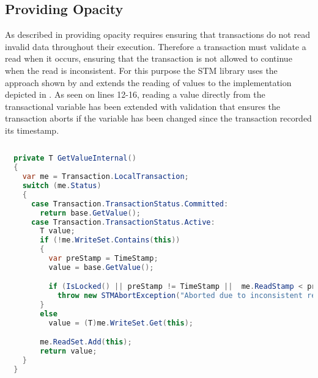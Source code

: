 \subsection{Providing Opacity}
As described in  providing opacity requires ensuring that transactions do not read invalid data throughout their execution. Therefore a transaction must validate a read when it occurs, ensuring that the transaction is not allowed to continue when the read is inconsistent. For this purpose the \ac{STM} library uses the approach shown by \cite[p. 117]{harris2010transactional} and extends the reading of values to the implementation depicted in . As seen on lines 12-16, reading a value directly from the transactional variable has been extended with validation that ensures the transaction aborts if the variable has been changed since the transaction recorded its timestamp.
\begin{lstlisting}[label=lst:library_opacity,
  caption={Providing Opacity},
  language=Java,  
  showspaces=false,
  showtabs=false,
  breaklines=true,
  showstringspaces=false,
  breakatwhitespace=true,
  commentstyle=\color{greencomments},
  keywordstyle=\color{bluekeywords},
  stringstyle=\color{redstrings},
  morekeywords={atomic, retry, orElse, var, get, set}]  % Start your code-block
  
  private T GetValueInternal()
  {
    var me = Transaction.LocalTransaction;
    switch (me.Status)
    {
      case Transaction.TransactionStatus.Committed:
        return base.GetValue();
      case Transaction.TransactionStatus.Active:
        T value;
        if (!me.WriteSet.Contains(this))
        {
          var preStamp = TimeStamp;
          value = base.GetValue();

          if (IsLocked() || preStamp != TimeStamp ||  me.ReadStamp < preStamp)
            throw new STMAbortException("Aborted due to inconsistent read");
        }
        else
          value = (T)me.WriteSet.Get(this);

        me.ReadSet.Add(this);
        return value;
    }
  }
\end{lstlisting}

